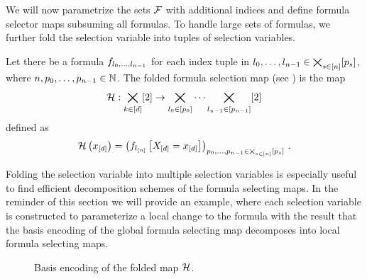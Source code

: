 
We will now parametrize the sets $\mathcal{F}$ with additional indices and define formula selector maps subsuming all formulas.
To handle large sets of formulas, we further fold the selection variable into tuples of selection variables.

\begin{definition}
    \label{def:formulaSelector}
    Let there be a formula $f_{l_{0},\ldots,l_{n-1}}$ for each index tuple in $l_{0},\ldots,l_{n-1}\in\bigtimes_{s\in[n]}[p_{s}]$, where $n,p_{0},\ldots,p_{n-1}\in\mathbb{N}$.
    The folded formula selection map (see ) is the map
    \begin{align*}
        \mathcal{H} : \bigtimes_{k\in[d]}[2] \rightarrow \bigtimes_{l_{0}\in[p_{0}]} \cdots \bigtimes_{l_{n-1}\in[p_{n-1}]} [2]
    \end{align*}
    defined as
    \begin{align*}
        \mathcal{H}\left(x_{[d]}\right) = \left( f_{l_{[n]}}\left[X_{[d]}=x_{[d]}\right] \right)_{p_{0},\ldots,p_{n-1}\in\bigtimes_{s\in[n]}[p_{s}]} \, .
    \end{align*}
%
\end{definition}

Folding the selection variable into multiple selection variables is especially useful to find efficient decomposition schemes of the formula selecting maps.
In the reminder of this section we will provide an example, where each selection variable is constructed to parameterize a local change to the formula with the result that the basis encoding of the global formula selecting map decomposes into local formula selecting maps.


\begin{figure}[h]
    \begin{center}
        
    \end{center}
    \caption{Basis encoding of the folded map $\mathcal{H}$.}
    \label{fig:foldedSelector}
\end{figure}





